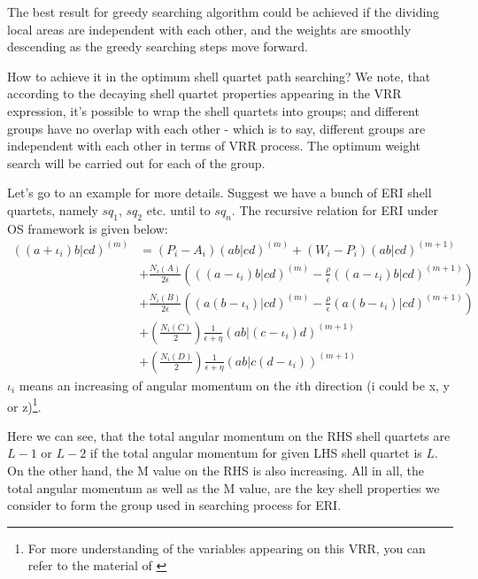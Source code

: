 The best result for greedy searching algorithm could be achieved 
if the dividing local areas are independent with each other, and the
weights are smoothly descending as the greedy searching steps move
forward.

How to achieve it in the optimum shell quartet path searching?
We note, that according to the decaying shell quartet properties 
appearing in the VRR expression, it's possible to wrap the shell
quartets into groups; and different groups have no overlap with
each other - which is to say, different groups are independent with 
each other in terms of VRR process. The optimum weight search will
be carried out for each of the group.

Let's go to an example for more details. Suggest we have a bunch of 
ERI shell quartets, namely $sq_{1}$, $sq_{2}$ etc. until to $sq_{n}$.
The recursive relation for ERI under OS framework is given below:
\begin{equation}
 \begin{split}
((a+\iota_{i})b|cd)^{(m)} &= (P_{i} - A_{i})(ab|cd)^{(m)} +
\left(W_{i} -P_{i}\right)(ab|cd)^{(m+1)} \\
&+\frac{N_{i}(A)}{2\epsilon}\left(((a-\iota_{i})b|cd)^{(m)}-\frac{\rho}{
\epsilon }((a-\iota_{i})b|cd)^{(m+1)}\right)  \\
&+\frac{N_{i}(B)}{2\epsilon}\left((a(b-\iota_{i})|cd)^{(m)}-\frac{\rho}{
\epsilon }(a(b-\iota_{i})|cd)^{(m+1)}\right)  \\
&+\left(\frac{N_{i}(C)}{2}\right)\frac{1}{\epsilon+\eta}
(ab|(c-\iota_{i})d)^{(m+1)} \\
&+\left(\frac{N_{i}(D)}{2}\right)\frac{1}{\epsilon+\eta}
(ab|c(d-\iota_{i}))^{(m+1)}
\end{split}
\label{OS_ERI_result}
\end{equation}
$\iota_{i}$ means an increasing of angular momentum on the $i$th direction (i
could be x, y or z)\footnote{For more understanding of the variables 
appearing on this VRR, you can refer to the material of \cite{OS1986}}. 

Here we can see, that the total angular momentum on the RHS shell quartets are 
$L-1$ or $L-2$ if the total angular momentum for given LHS shell quartet is $L$.
On the other hand, the M value on the RHS is also increasing. All in all, the 
total angular momentum as well as the M value, are the key shell properties
we consider to form the group used in searching process for ERI.

